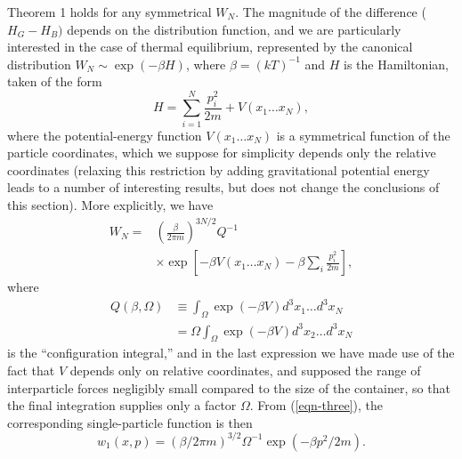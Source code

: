 \documentclass[twocolumn]{article}
\begin{document}
Theorem 1 holds for any symmetrical $W_N$. The magnitude of the difference ($H_G - H_B)$ depends on the distribution function, and we are particularly interested in the case of thermal equilibrium, represented by the canonical distribution $W_N \sim \exp (-\beta H)$, where $\beta = (kT)^{-1}$ and $H$ is the Hamiltonian, taken of the form
%
\begin{equation}
H = \sum_{i = 1}^{N}\frac{p_{i}^{2}}{2m} + V\left( x_{1}\ldots x_{N} \right),
\label{eqn-six}
\end{equation}
%
where the potential-energy function \(V(x_{1}\ldots x_{N})\) is a
symmetrical function of the particle coordinates, which we suppose for
simplicity depends only the relative coordinates (relaxing this
restriction by adding gravitational potential energy leads to a number
of interesting results, but does not change the conclusions of this
section). More explicitly, we have
%
\begin{align}
W_{N} = & \left( \frac{\beta}{2\pi m} \right)^{3N/2}Q^{- 1} \nonumber \\
& \times \exp{\left\lbrack - \beta V\left( x_{1}\ldots x_{N} \right) - \beta\sum_{i}^{}\frac{p_{i}^{2}}{2m} \right\rbrack,}
\label{eqn-seven}
\end{align}
%
where
%
\begin{align}
Q\left( \beta,\Omega \right) & \equiv \int_{\Omega}^{}{\exp{\left( - \beta V \right)d^{3}x_{1}\ldots d^{3}x_{N}}} \nonumber \\ & = \Omega\int_{\Omega}^{}{\exp{\left( - \beta V \right)d^{3}x_{2}\ldots d^{3}x_{N}}}
\label{eqn-eight}
\end{align}
%
is the ``configuration integral,'' and in the last expression we have
made use of the fact that $V$ depends only on relative coordinates,
and supposed the range of interparticle forces negligibly small compared
to the size of the container, so that the final integration supplies
only a factor \(\Omega\). From (\ref{eqn-three}), the corresponding single-particle function is then
%
\begin{equation}
w_{1}\left( x,p \right) = {(\beta/2\pi m)}^{3/2}\Omega^{- 1}\exp{( - \beta p^{2}/2m).}
\label{eqn-nine}
\end{equation}
\end{document}
